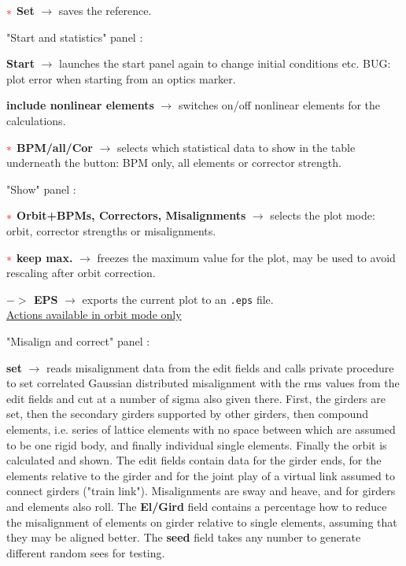 \documentclass[12pt]{article}
\newcommand{\redast}{{\color{red}\ast}}
\newcommand\code[1]{{\tt #1}}
\newcommand{\ofld}[1]{\colorbox{black!15}{{{\color{black}\bf #1}}}}
\newcommand\guico[1]{{\color{blue}\code{#1}}}
\newcommand{\evcod}[2]{\ofld{#1} $\rightarrow$ \guico{#2}}
\newcommand{\opagui}[1]{\colorbox{blue!20}{{\color{black}\code{#1}}}}
\newcommand{\ogui}[1]{\hyperref[#1]{\opagui{#1}}}
\newcommand{\todo}[1]{{\color{red} #1}}
\begin{document}
$\redast$ \evcod{Set}{butBPMrefClick} saves the reference.

"Start and statistics" panel \guico{panctr}:

\evcod{Start}{butStaClick} launches the \ogui{ostartmenu} start panel again to change initial conditions etc. \todo{BUG: plot error when starting from an optics marker.}

\evcod{include nonlinear elements}{chkSextClick} switches on/off nonlinear elements for the calculations.

$\redast$ \evcod{BPM/all/Cor}{butCODstatClick} selects which statistical data to show in the table underneath the button: BPM only, all elements or corrector strength.

"Show" panel \guico{panplo}:

$\redast$ \evcod{Orbit+BPMs, Correctors, Misalignments}{butplotOCClick} selects the plot mode: orbit, corrector strengths or misalignments.

$\redast$ \evcod{keep max.}{chkKeepMaxClick} freezes the maximum value for the plot, may be used to avoid rescaling after orbit correction.

\evcod{$-\!\!>$ EPS}{butEPSClick} exports the current plot to an \code{.eps} file.\\[1ex]


\underline{Actions available in orbit mode only}

"Misalign and correct" panel \guico{panmis}:

\evcod{set}{butMisalClick} reads misalignment data from the edit fields and calls private procedure \guico{SetMisalignments} to set correlated Gaussian distributed misalignment with the rms values from the edit fields and cut at a number of sigma also given there. First, the girders are set, then the secondary girders supported by other girders, then compound elements, i.e. series of lattice elements with no space between which are assumed to be one rigid body, and finally individual single elements. Finally the orbit is calculated and shown. The edit fields contain data for the girder ends, for the elements relative to the girder and for the joint play of a virtual link assumed to connect girders ("train link"). Misalignments are sway and heave, and for girders and elements also roll. The \ofld{El/Gird} field contains a percentage how to reduce the misalignment of elements on girder relative to single elements, assuming that they may be aligned better. The \ofld{seed} field takes any number to generate different random sees for testing.
\end{document}

